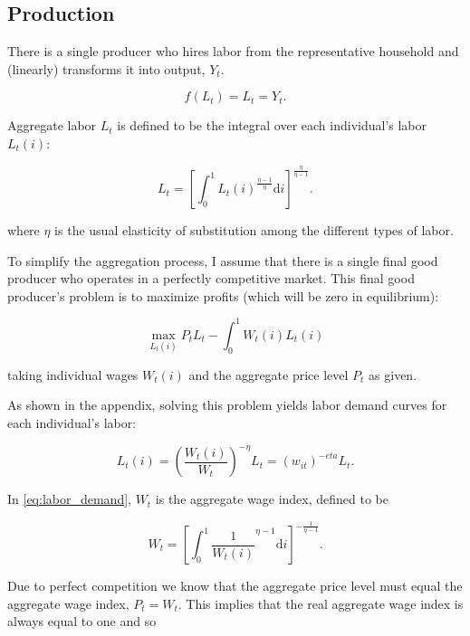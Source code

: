 \documentclass[12pt,a4paper]{scrartcl}            %
\begin{document}
\subsection{Production}
\label{sub:production}

There is a single producer who hires labor from the representative household and (linearly) transforms it into output, $Y_t$.

\begin{equation} \label{eq:agg_output}
    f(L_t) = L_t = Y_t.
\end{equation}

Aggregate labor \(L_t\) is defined to be the integral over each individual's labor \(L_t(i)\):

\begin{equation} \label{eq:agg_labor}
    L_t = \left[ \int_0^1 L_t(i)^{\frac{\eta - 1}{\eta}} \mathrm{d}i \right]^{\frac{\eta}{\eta - 1}}.
\end{equation}

where $\eta$ is the usual elasticity of substitution among the different types of labor.

To simplify the aggregation process, I assume that there is a single final good producer who operates in a perfectly competitive market.
This final good producer's problem is to maximize profits (which will be zero in equilibrium):

\begin{equation} \label{eq:firms_problem}
    \max_{L_t(i)} P_t L_t - \int_0^1 W_t(i)L_t(i)
\end{equation}

taking individual wages $W_t(i)$ and the aggregate price level $P_t$ as given.

As shown in the appendix, solving this problem yields labor demand curves for each individual's labor:

\begin{equation}
    \label{eq:labor_demand}
    L_t(i) = \left( \frac{W_t(i)}{W_t} \right)^{-\eta}L_t = (w_{it})^{-eta}L_t.
\end{equation}

In \ref{eq:labor_demand}, $W_t$ is the aggregate wage index, defined to be

\begin{equation} \label{eq:wage_index}
    W_t = \left[\int_{0}^{1}\frac{1}{W_t(i)}^{\eta - 1} \mathrm{d}i \right]^{-\frac{1}{\eta - 1}}.
\end{equation}

Due to perfect competition we know that the aggregate price level must equal the aggregate wage index, $P_t = W_t$.  This implies that the real aggregate wage index is always equal to one and so
\end{document}
